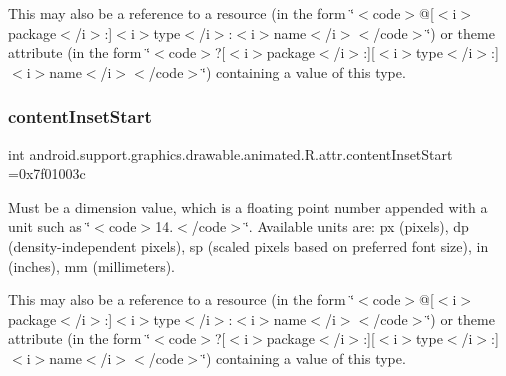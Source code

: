 This may also be a reference to a resource (in the form \char`\"{}$<$code$>$@\mbox{[}$<$i$>$package$<$/i$>$\+:\mbox{]}$<$i$>$type$<$/i$>$\+:$<$i$>$name$<$/i$>$$<$/code$>$\char`\"{}) or theme attribute (in the form \char`\"{}$<$code$>$?\mbox{[}$<$i$>$package$<$/i$>$\+:\mbox{]}\mbox{[}$<$i$>$type$<$/i$>$\+:\mbox{]}$<$i$>$name$<$/i$>$$<$/code$>$\char`\"{}) containing a value of this type. \mbox{\label{classandroid_1_1support_1_1graphics_1_1drawable_1_1animated_1_1R_1_1attr_ab5f1d709d7c1f296a1833189f94239a4}} 
\subsubsection{\texorpdfstring{content\+Inset\+Start}{contentInsetStart}}
{\footnotesize\ttfamily int android.\+support.\+graphics.\+drawable.\+animated.\+R.\+attr.\+content\+Inset\+Start =0x7f01003c\hspace{0.3cm}{\ttfamily [static]}}

Must be a dimension value, which is a floating point number appended with a unit such as \char`\"{}$<$code$>$14.\+5sp$<$/code$>$\char`\"{}. Available units are\+: px (pixels), dp (density-\/independent pixels), sp (scaled pixels based on preferred font size), in (inches), mm (millimeters). 

This may also be a reference to a resource (in the form \char`\"{}$<$code$>$@\mbox{[}$<$i$>$package$<$/i$>$\+:\mbox{]}$<$i$>$type$<$/i$>$\+:$<$i$>$name$<$/i$>$$<$/code$>$\char`\"{}) or theme attribute (in the form \char`\"{}$<$code$>$?\mbox{[}$<$i$>$package$<$/i$>$\+:\mbox{]}\mbox{[}$<$i$>$type$<$/i$>$\+:\mbox{]}$<$i$>$name$<$/i$>$$<$/code$>$\char`\"{}) containing a value of this type. \mbox{\label{classandroid_1_1support_1_1graphics_1_1drawable_1_1animated_1_1R_1_1attr_ac32fe9207a7099d3bbab16c56c509fd3}} 
